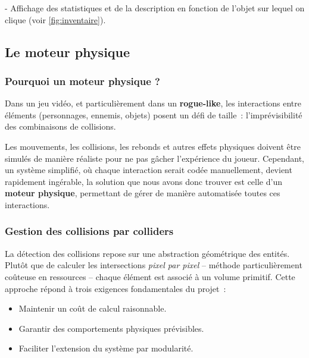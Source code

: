 \documentclass[a4paper,11pt]{article}
\begin{document}
   - Affichage des statistiques et de la description en fonction de l'objet sur lequel on clique (voir \autoref{fig:inventaire}).




\newpage

\subsection{Le moteur physique}



\subsubsection{Pourquoi un moteur physique ?}
\label{sec:moteur_physique}

Dans un jeu vidéo, et particulièrement dans un \textbf{rogue-like}, les interactions entre éléments (personnages, ennemis, objets) posent un défi de taille~: l'imprévisibilité des combinaisons de collisions. 

Les mouvements, les collisions, les rebonds et autres effets physiques doivent être simulés de manière réaliste pour ne pas gâcher l’expérience du joueur. Cependant, un système simplifié, où chaque interaction serait codée manuellement, devient rapidement ingérable, la solution que nous avons donc trouver est celle d'un \textbf{moteur physique}, permettant de gérer de manière automatisée toutes ces interactions.


\subsubsection{Gestion des collisions par colliders} 
\label{sec:colliders}
La détection des collisions repose sur une abstraction géométrique des entités. Plutôt que de calculer les intersections \textit{pixel par pixel} -- méthode particulièrement coûteuse en ressources -- chaque élément est associé à un volume primitif. Cette approche répond à trois exigences fondamentales du projet~:

\begin{itemize}
    \item Maintenir un coût de calcul raisonnable.
    \item Garantir des comportements physiques prévisibles.
    \item Faciliter l'extension du système par modularité.
\end{itemize}
\end{document}
